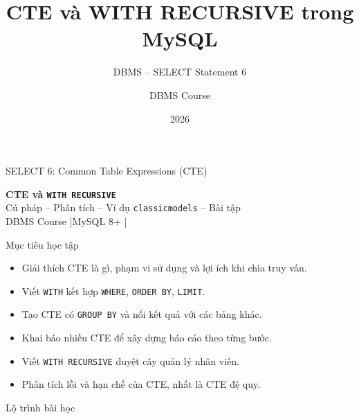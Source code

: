 \documentclass[aspectratio=169,10pt]{beamer}
\title[SQL SELECT 6]{CTE và WITH RECURSIVE trong MySQL}
\subtitle{DBMS -- SELECT Statement 6}
\author{DBMS Course}
\institute{Smart Logistics and Supply Chain Management Lab}
\date{2026}
\newcommand{\code}[1]{\texttt{#1}}
\begin{document}
\begin{frame}[fragile]{SELECT 6: Common Table Expressions (CTE)}

\vspace{.65cm}
\begin{center}
{\Huge\bfseries CTE và \texttt{WITH RECURSIVE}}\\[.35cm]
{\large Cú pháp -- Phân tích -- Ví dụ \texttt{classicmodels} -- Bài tập}\\[.65cm]
{\small DBMS Course \quad|\quad MySQL 8+ \quad|}
\end{center}
\end{frame}

\begin{frame}[fragile]{Mục tiêu học tập}
\small
\begin{itemize}
\item Giải thích CTE là gì, phạm vi sử dụng và lợi ích khi chia truy vấn.
\item Viết \code{WITH} kết hợp \code{WHERE}, \code{ORDER BY}, \code{LIMIT}.
\item Tạo CTE có \code{GROUP BY} và nối kết quả với các bảng khác.
\item Khai báo nhiều CTE để xây dựng báo cáo theo từng bước.
\item Viết \code{WITH RECURSIVE} duyệt cây quản lý nhân viên.
\item Phân tích lỗi và hạn chế của CTE, nhất là CTE đệ quy.
\end{itemize}
\end{frame}

\begin{frame}[fragile]{Lộ trình bài học}

\begin{center}
\end{center}
\end{frame}
\end{document}
